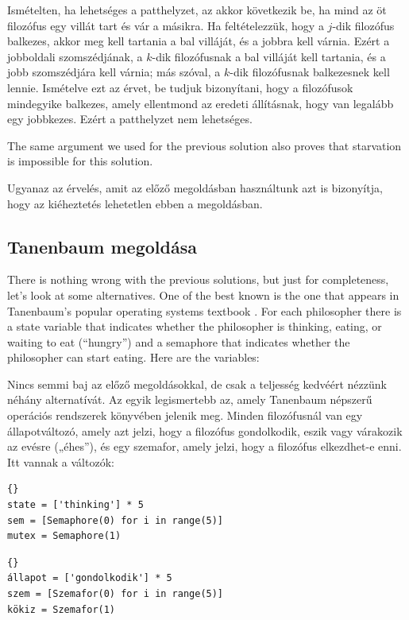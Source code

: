 \documentclass{book}
\newcommand{\clearemptydoublepage}{\newpage\cleardoublepage}
\begin{document}
Ismételten, ha lehetséges a patthelyzet, az akkor következik be, ha mind
az öt filozófus egy villát tart és vár a másikra. Ha feltételezzük,
hogy a $j$-dik filozófus balkezes, akkor meg kell tartania a bal villáját,
és a jobbra kell várnia. Ezért a jobboldali szomszédjának, a $k$-dik filozófusnak
a bal villáját kell tartania, és a jobb szomszédjára kell várnia;
más szóval, a $k$-dik filozófusnak balkezesnek kell lennie. Ismételve ezt az
érvet, be tudjuk bizonyítani, hogy a filozófusok mindegyike balkezes,
amely ellentmond az eredeti állításnak, hogy van legalább egy jobbkezes.
Ezért a patthelyzet nem lehetséges.

The same argument we used for the previous solution also proves
that starvation is impossible for this solution.

Ugyanaz az érvelés, amit az előző megoldásban használtunk azt is
bizonyítja, hogy az kiéheztetés lehetetlen ebben a megoldásban.

\clearemptydoublepage
\subsection{Tanenbaum megoldása}

There is nothing wrong with the previous solutions, but just for
completeness, let's look at some alternatives.  One of the best known
is the one that appears in Tanenbaum's popular operating systems
textbook \cite{tanenbaum}.
For each philosopher there is a state variable that
indicates whether the philosopher is thinking, eating, or waiting to
eat (``hungry'') and a semaphore that indicates whether the
philosopher can start eating.  Here are the variables:

Nincs semmi baj az előző megoldásokkal, de csak a teljesség kedvéért
nézzünk néhány alternatívát. Az egyik legismertebb az, amely
Tanenbaum népszerű operációs rendszerek könyvében \cite{tanenbaum} jelenik meg.
Minden filozófusnál van egy állapotváltozó, amely azt jelzi, hogy a
filozófus gondolkodik, eszik vagy várakozik az evésre („éhes”), és
egy szemafor, amely jelzi, hogy a filozófus elkezdhet-e enni.
Itt vannak a változók:

\begin{lstlisting}[title={Variables for Tanenbaum's solution}]{}
state = ['thinking'] * 5
sem = [Semaphore(0) for i in range(5)]
mutex = Semaphore(1)
\end{lstlisting}

\begin{lstlisting}[title={Változók Tanenbaum megoldásához}]{}
állapot = ['gondolkodik'] * 5
szem = [Szemafor(0) for i in range(5)]
kökiz = Szemafor(1)
\end{lstlisting}
\end{document}
